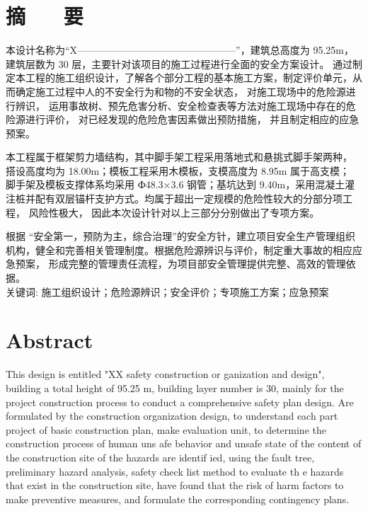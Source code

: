 \section*{ \centering 摘 ~~ 要}

\vskip0.5cm
本设计名称为“X————————————————”，建筑总高度为 95.25m， 建筑层数为 30  层，主要针对该项目的施工过程进行全面的安全方案设计。
通过制定本工程的施工组织设计，了解各个部分工程的基本施工方案，制定评价单元，从而确定施工过程中人的不安全行为和物的不安全状态，
对施工现场中的危险源进行辨识， 运用事故树、预先危害分析、安全检查表等方法对施工现场中存在的危险源进行评价， 对已经发现的危险危害因素做出预防措施，
并且制定相应的应急预案。

本工程属于框架剪力墙结构，其中脚手架工程采用落地式和悬挑式脚手架两种， 搭设高度均为 18.00m；模板工程采用木模板，支模高度为 8.95m 属于高支模；
脚手架及模板支撑体系均采用 Ф48.3×3.6 钢管；基坑达到 9.40m，采用混凝土灌注桩并配有双层锚杆支护方式。均属于超出一定规模的危险性较大的分部分项工程，
风险性极大， 因此本次设计针对以上三部分分别做出了专项方案。

根据 “安全第一，预防为主，综合治理”的安全方针，建立项目安全生产管理组织机构，健全和完善相关管理制度。根据危险源辨识与评价，制定重大事故的相应应急预案，
形成完整的管理责任流程，为项目部安全管理提供完整、高效的管理依据。\\



{ \heiti 关键词: } 施工组织设计；危险源辨识；安全评价；专项施工方案；应急预案

\clearpage
\section*{ \centering \textbf{Abstract} }

   This design is entitled "XX safety construction or ganization and design", building a total height of 95.25 m, building layer number is 30, 
   mainly for the project construction process to conduct a comprehensive safety plan design. Are formulated by the construction organization design, 
   to understand each part project of basic construction plan, make evaluation unit, to determine the construction process of human uns afe behavior 
   and unsafe state of the content of the construction site of the hazards are identif ied, using the fault tree, preliminary hazard analysis, safety 
   check list method to evaluate th e hazards that exist in the construction site, have found that the risk of harm factors to make preventive measures,
    and formulate the corresponding contingency plans.

